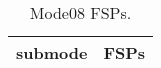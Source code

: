 \begin{table}[h!]
\begin{center}
\begin{tabular}{cl}
\hline
submode& FSPs\\
\hline
\hline
\end{tabular}
\label{tab:Mode08FSPs}
\caption{Mode08 FSPs.}
\end{center}
\end{table}
